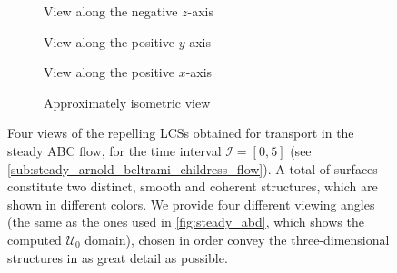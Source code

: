 \begin{figure}[htpb]
    \centering
    \begin{subfigure}[b]{0.475\textwidth}
        \centering
        \caption[]{{\small View along the negative $z$-axis}}
        \label{fig:steady_lcss_z}
    \end{subfigure}
    \begin{subfigure}[b]{0.475\textwidth}
        \centering
        \caption[]{{\small View along the positive $y$-axis}}
        \label{fig:steady_lcss_y}
    \end{subfigure}

    \begin{subfigure}[b]{0.475\textwidth}
        \centering
        \caption[]{{\small View along the positive $x$-axis}}
        \label{fig:steady_lcss_x}
    \end{subfigure}
    \begin{subfigure}[b]{0.475\textwidth}
        \centering
        \caption[]{{\small Approximately isometric view}}
        \label{fig:steady_lcss_isometric}
    \end{subfigure}
    \caption[Four views of the repelling LCSs obtained for transport in the
    steady ABC flow]
    {
        Four views of the repelling LCSs obtained for transport in the steady
        ABC flow, for the time interval $\mathcal{I}=[0,5]$ (see
        \cref{sub:steady_arnold_beltrami_childress_flow}). A total of
         surfaces constitute two distinct, smooth and coherent
        structures, which are shown in different colors. We provide four
        different viewing angles (the same as the ones used in
        \cref{fig:steady_abd}, which shows the computed $\mathcal{U}_{0}$
        domain), chosen in order convey the three-dimensional structures in as
        great detail as possible.
}
    \label{fig:steady_lcss}
\end{figure}

